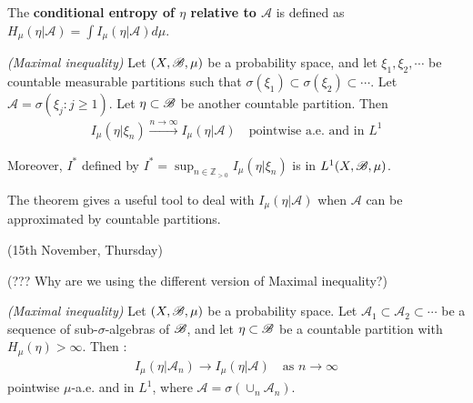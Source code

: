 \documentclass[10pt,a4paper]{report}
\begin{document}
 The \textbf{conditional entropy of $\eta$ relative to $\mathscr{A}$} is defined as $H_{\mu}(\eta | \mathscr{A}) = \int I_{\mu}(\eta | \mathscr{A}) d\mu$. 
\s

\thm \emph{(Maximal inequality)} Let $(X,\mathscr{B}, \mu)$ be a probability space, and let $\xi_1, \xi_2, \cdots$ be countable measurable partitions such that $\sigma(\xi_1) \subset \sigma(\xi_2) \subset \cdots$. Let $\mathscr{A} = \sigma(\xi_j:j\geq 1)$. Let $\eta \subset \mathscr{B}$ be another countable partition. Then 
\begin{align*}
I_{\mu}(\eta | \xi_n) \xrightarrow{n\rightarrow \infty} I_{\mu}(\eta | \mathscr{A}) \quad \text{pointwise a.e. and in } L^1
\end{align*}

\quad Moreover, $I^*$ defined by $I^* = \sup_{n\in \mathbb{Z}_{>0}} I_{\mu}(\eta | \xi_n)$ is in $L^1(X,\mathscr{B}, \mu)$.
\s

The theorem gives a useful tool to deal with $I_{\mu}(\eta | \mathscr{A})$ when $\mathscr{A}$ can be approximated by countable partitions. 
\s

\newday

(15th November, Thursday)
\s

(??? Why are we using the different version of Maximal inequality?)
\s

\thm \emph{(Maximal inequality)} Let $(X,\mathscr{B}, \mu)$ be a probability space. Let $\mathscr{A}_1 \subset \mathscr{A}_2 \subset \cdots$ be a sequence of sub-$\sigma$-algebras of $\mathscr{B}$, and let $\eta \subset \mathscr{B}$ be a countable partition with $H_{\mu}(\eta) >\infty$. Then :
\begin{align*}
I_{\mu}(\eta | \mathscr{A}_n) \rightarrow I_{\mu}(\eta | \mathscr{A}) \quad \text{as } n\rightarrow \infty
\end{align*}
pointwise $\mu$-a.e. and in $L^1$, where $\mathscr{A} = \sigma(\cup_n \mathscr{A}_n)$.
\end{document}
